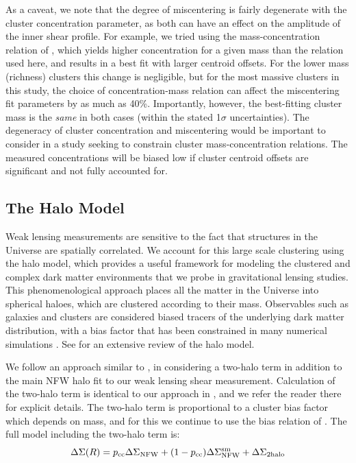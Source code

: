 As a caveat, we note that the degree of miscentering is fairly degenerate with the cluster concentration parameter, as both can have an effect on the amplitude of the inner shear profile. For example, we tried using the mass-concentration relation of \citet{Prada12}, which yields higher concentration for a given mass than the \citet{Dutton14} relation used here, and results in a best fit with larger centroid offsets. For the lower mass (richness) clusters this change is negligible, but for the most massive clusters in this study, the choice of concentration-mass relation can affect the miscentering fit parameters by as much as 40\%. Importantly, however, the best-fitting cluster mass is the {\it same} in both cases (within the stated 1$\sigma$ uncertainties). The degeneracy of cluster concentration and miscentering would be important to consider in a study seeking to constrain cluster mass-concentration relations. The measured concentrations will be biased low if cluster centroid offsets are significant and not fully accounted for.



\subsection{The Halo Model}
\label{sec:halomodel4}
Weak lensing measurements are sensitive to the fact that structures in the Universe are spatially correlated. We account for this large scale clustering using the halo model, which provides a useful framework for modeling the clustered and complex dark matter environments that we probe in gravitational lensing studies. This phenomenological approach places all the matter in the Universe into spherical haloes, which are clustered according to their mass. Observables such as galaxies and clusters are considered biased tracers of the underlying dark matter distribution, with a bias factor that has been constrained in many numerical simulations \citep[e.g.][]{Mo96,Sheth99,Tinker10}. See \citet{Cooray02} for an extensive review of the halo model.

We follow an approach similar to \citet{Johnston07}, in considering a two-halo term in addition to the main \ac{NFW} halo fit to our weak lensing shear measurement. Calculation of the two-halo term is identical to our approach in \citet{Ford14}, and we refer the reader there for explicit details. The two-halo term is proportional to a cluster bias factor which depends on mass, and for this we continue to use the bias relation of \citet{Seljak04}. The full model including the two-halo term is:
\begin{equation}
\Delta\Sigma(R) = p_{\mathrm{cc}}\Delta\Sigma_{\mathrm{NFW}} +(1-p_{\mathrm{cc}})\Delta\Sigma_{\mathrm{NFW}}^{\rm sm} + \Delta\Sigma_{\mathrm{2halo}}
\label{modelEQ4}
\end{equation}

